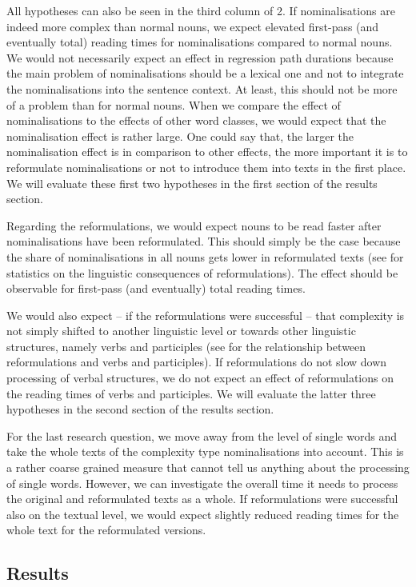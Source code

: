 \documentclass[output=paper]{langsci/langscibook}
\begin{document}
All hypotheses can also be seen in the third column of 2. If nominalisations are indeed more complex than normal nouns, we expect elevated first-pass (and eventually total) reading times for nominalisations compared to normal nouns. We would not necessarily expect an effect in regression path durations because the main problem of nominalisations should be a lexical one and not to integrate the nominalisations into the sentence context. At least, this should not be more of a problem than for normal nouns. When we compare the effect of nominalisations to the effects of other word classes, we would expect that the nominalisation effect is rather large. One could say that, the larger the nominalisation effect is in comparison to other effects, the more important it is to reformulate nominalisations or not to introduce them into texts in the first place. We will evaluate these first two hypotheses in the first section of the results section.

Regarding the reformulations, we would expect nouns to be read faster after nominalisations have been reformulated. This should simply be the case because the share of nominalisations in all nouns gets lower in reformulated texts (see  for statistics on the linguistic consequences of reformulations). The effect should be observable for first-pass (and eventually) total reading times.

We would also expect – if the reformulations were successful – that complexity is not simply shifted to another linguistic level or towards other linguistic structures, namely verbs and participles (see  for the relationship between reformulations and verbs and participles). If reformulations do not slow down processing of verbal structures, we do not expect an effect of reformulations on the reading times of verbs and participles. We will evaluate the latter three hypotheses in the second section of the results section.

For the last research question, we move away from the level of single words and take the whole texts of the complexity type nominalisations into account. This is a rather coarse grained measure that cannot tell us anything about the processing of single words. However, we can investigate the overall time it needs to process the original and reformulated texts as a whole. If reformulations were successful also on the textual level, we would expect slightly reduced reading times for the whole text for the reformulated versions.

\subsection{\label{bkm:Ref283726141}Results}
\end{document}
